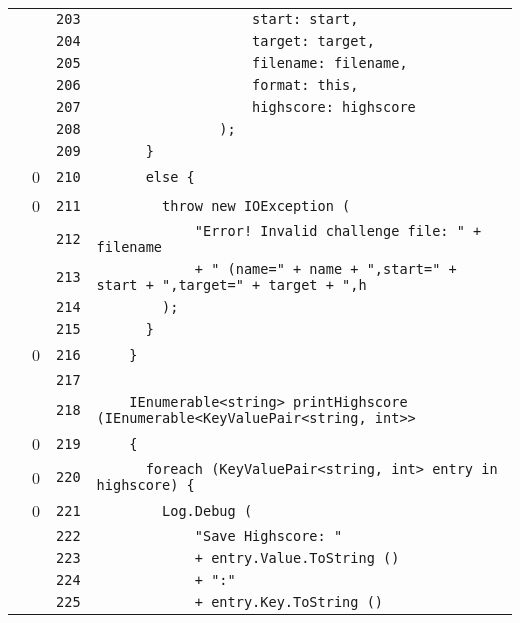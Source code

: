 \documentclass[a4paper,10pt]{article}
\begin{document}
\begin{longtable}[l]{lrrl}
\cellcolor{gray} &  & \verb~203~ & \verb~                   start: start,~\\
\cellcolor{gray} &  & \verb~204~ & \verb~                   target: target,~\\
\cellcolor{gray} &  & \verb~205~ & \verb~                   filename: filename,~\\
\cellcolor{gray} &  & \verb~206~ & \verb~                   format: this,~\\
\cellcolor{gray} &  & \verb~207~ & \verb~                   highscore: highscore~\\
\cellcolor{gray} &  & \verb~208~ & \verb~               );~\\
\cellcolor{gray} &  & \verb~209~ & \verb~      }~\\
\cellcolor{red} & 0 & \verb~210~ & \verb~      else {~\\
\cellcolor{red} & 0 & \verb~211~ & \verb~        throw new IOException (~\\
\cellcolor{gray} &  & \verb~212~ & \verb~            "Error! Invalid challenge file: " + filename~\\
\cellcolor{gray} &  & \verb~213~ & \verb~            + " (name=" + name + ",start=" + start + ",target=" + target + ",h~\\
\cellcolor{gray} &  & \verb~214~ & \verb~        );~\\
\cellcolor{gray} &  & \verb~215~ & \verb~      }~\\
\cellcolor{red} & 0 & \verb~216~ & \verb~    }~\\
\cellcolor{gray} &  & \verb~217~ & \verb~~\\
\cellcolor{gray} &  & \verb~218~ & \verb~    IEnumerable<string> printHighscore (IEnumerable<KeyValuePair<string, int>>~\\
\cellcolor{red} & 0 & \verb~219~ & \verb~    {~\\
\cellcolor{red} & 0 & \verb~220~ & \verb~      foreach (KeyValuePair<string, int> entry in highscore) {~\\
\cellcolor{red} & 0 & \verb~221~ & \verb~        Log.Debug (~\\
\cellcolor{gray} &  & \verb~222~ & \verb~            "Save Highscore: "~\\
\cellcolor{gray} &  & \verb~223~ & \verb~            + entry.Value.ToString ()~\\
\cellcolor{gray} &  & \verb~224~ & \verb~            + ":"~\\
\cellcolor{gray} &  & \verb~225~ & \verb~            + entry.Key.ToString ()~\\

\end{longtable}
\end{document}
